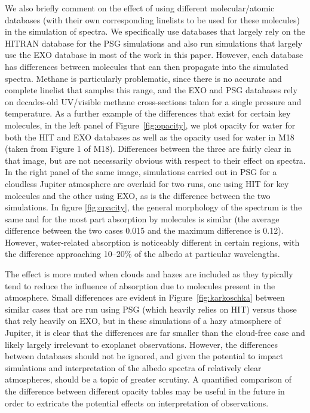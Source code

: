 \documentclass[12pt, letterpaper]{aastex631}
\begin{document}
We also briefly comment on the effect of using different molecular/atomic databases (with their own corresponding linelists to be used for these molecules) in the simulation of spectra.   We specifically use databases that largely rely on the HITRAN \citep{2017JQSRT.203....3G} database for the PSG simulations and also run simulations that largely use the EXO database \citep{2008ApJS..174..504F, 2014ApJS..214...25F, 2017PASP..129d4402K} in most of the work in this paper.  However, each database has differences between molecules that can then propagate into the simulated spectra. Methane is particularly problematic, since there is no accurate and complete linelist that samples this range, and the EXO and PSG databases rely on decades-old UV/visible methane cross-sections taken for a single pressure and temperature. As a further example of the differences that exist for certain key molecules, in the left panel of Figure~\ref{fig:opacity}, we plot opacity for water for both the HIT and EXO databases as well as the opacity used for water in M18 (taken from Figure 1 of M18).  Differences between the three are fairly clear in that image, but are not necessarily obvious with respect to their effect on spectra.  In the right panel of the same image, simulations carried out in PSG for a cloudless Jupiter atmosphere are overlaid for two runs, one using HIT for key molecules and the other using EXO, as is the difference between the two simulations.  In figure \ref{fig:opacity}, the general morphology of the spectrum is the same and for the most part absorption by molecules is similar (the average difference between the two cases 0.015 and the maximum difference is 0.12). However, water-related absorption is noticeably different in certain regions, with the difference approaching 10--20\% of the albedo at particular wavelengths. 

The effect is more muted when clouds and hazes are included as they typically tend to reduce the influence of absorption due to molecules present in the atmosphere. Small differences are evident in Figure~\ref{fig:karkoschka} between similar cases that are run using PSG (which heavily relies on HIT) versus those that rely heavily on EXO, but in these simulations of a hazy atmosphere of Jupiter, it is clear that the differences are far smaller than the cloud-free case and likely largely irrelevant to exoplanet observations. However, the differences between databases should not be ignored, and given the potential to impact simulations and interpretation of the albedo spectra of relatively clear atmospheres, should be a topic of greater scrutiny. A quantified comparison of the difference between different opacity tables may be useful in the future in order to extricate the potential effects on interpretation of observations. 
\end{document}
